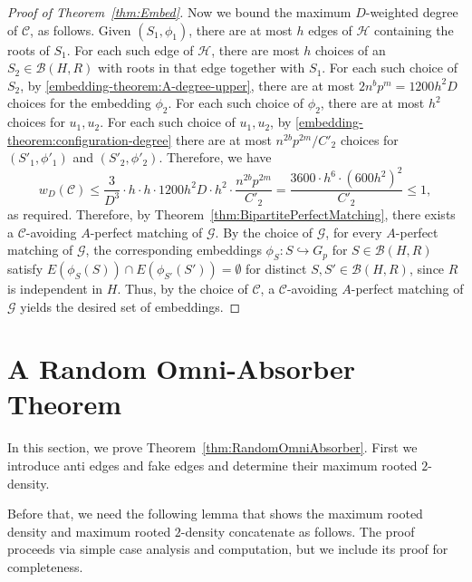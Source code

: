 \documentclass[11pt]{article}
\numberwithin{equation}{section}
\newcounter{i}
\theoremstyle{plain}
\theoremstyle{plain} %
\theoremstyle{definition}
\newcommand{\cC}{\mathcal{C}}
\newcommand{\cB}{\mathcal{B}}
\newcommand{\cH}{\mathcal{H}}
\newcommand{\cG}{\mathcal{G}}
\begin{document}
\begin{proof}[Proof of Theorem~\ref{thm:Embed}]
Now we bound the maximum $D$-weighted degree of $\cC$, as follows.
Given $(S_1, \phi_1)$, there are at most $h$ edges of $\cH$ containing the roots of $S_1$.  For each such edge of $\cH$, there are most $h$ choices of an $S_2 \in \cB(H, R)$ with roots in that edge together with $S_1$.  For each such choice of $S_2$, by \ref{embedding-theorem:A-degree-upper}, there are at most $2n^bp^m = 1200h^2 D$ choices for the embedding $\phi_2$. 
For each such choice of $\phi_2$, there are at most $h^2$ choices for $u_1, u_2$.  For each such choice of $u_1,u_2$, by \ref{embedding-theorem:configuration-degree} there are at most $n^{2b}p^{2m} / C'_2$ choices for $(S'_1, \phi'_1)$ and $(S'_2, \phi'_2)$.  
Therefore, we have 
\begin{equation*}
    w_D(\cC) \leq \frac{3}{D^3}\cdot h\cdot h\cdot 1200h^2 D \cdot h^2 \cdot \frac{n^{2b}p^{2m}}{C'_2} = \frac{3600\cdot h^6\cdot (600h^2)^2}{C'_2}\leq 1,
\end{equation*}
as required.  Therefore, by Theorem~\ref{thm:BipartitePerfectMatching}, there exists a $\cC$-avoiding $A$-perfect matching of $\cG$.  By the choice of $\cG$, for every $A$-perfect matching of $\cG$, the corresponding embeddings $\phi_S : S\hookrightarrow G_p$ for $S \in \cB(H,R)$ satisfy $E(\phi_S(S)) \cap E(\phi_{S'}(S')) = \emptyset$ for distinct $S,S' \in \cB(H, R)$, since $R$ is independent in $H$.  Thus, by the choice of $\cC$, a $\cC$-avoiding $A$-perfect matching of $\cG$ yields the desired set of embeddings.
\end{proof}

\section{A Random Omni-Absorber Theorem}\label{s:RandomOmniAbsorber}

In this section, we prove Theorem~\ref{thm:RandomOmniAbsorber}. First we introduce anti edges and fake edges and determine their maximum rooted $2$-density. 

Before that, we need the following lemma that shows the maximum rooted density and maximum rooted $2$-density concatenate as follows. The proof proceeds via simple case analysis and computation, but we include its proof for completeness.
\end{document}
